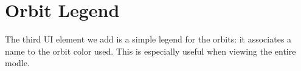 \section{Orbit Legend}
The third UI element we add is a simple legend for the orbits: it associates a name to the orbit color used. This is especially useful when viewing the entire modle.